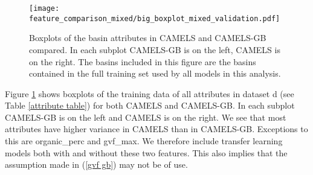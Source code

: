 \begin{figure}
    \centering
    \texttt{[image: feature\_comparison\_mixed/big\_boxplot\_mixed\_validation.pdf]}
    \caption{Boxplots of the basin attributes in CAMELS and CAMELS-GB compared. 
    In each subplot CAMELS-GB is on the left, CAMELS is on the right. The basins included in this 
    figure are the basins contained in the full training set used by all models 
    in this analysis.}
    \label{attribute comparison}
\end{figure}
Figure \ref{attribute comparison} shows boxplots of the training data of all attributes 
in dataset d (see Table 
\ref{attribute table}) for both CAMELS and CAMELS-GB. In each subplot CAMELS-GB is 
on the left and CAMELS is on the right. We see that most attributes have higher 
variance in CAMELS than in CAMELS-GB. Exceptions to this are organic\_perc and gvf\_max. 
We therefore include transfer learning models both with and without these two features. 
This also implies that the assumption made in (\ref{gvf gb}) may not be of use.
